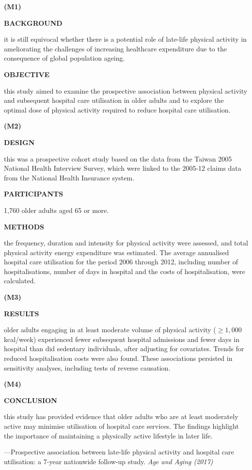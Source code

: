 \documentclass{ctexbook}
\begin{document}
\begin{sample}[label={myautocounter}]{\heiti}

\textbf{(M1)}

\textbf{BACKGROUND }

it is still equivocal whether there is a potential role of late-life physical activity in ameliorating the challenges of increasing healthcare expenditure due to the consequence of global population ageing.

\textbf{OBJECTIVE} 

this study aimed to examine the prospective association between physical activity and subsequent hospital care utilisation in older adults and to explore the optimal dose of physical activity required to reduce hospital care utilisation.

\textbf{(M2)}

\textbf{DESIGN} 

this was a prospective cohort study based on the data from the Taiwan 2005 National Health Interview Survey, which were linked to the 2005-12 claims data from the National Health Insurance system.

\textbf{PARTICIPANTS}

1,760 older adults aged 65 or more.

\textbf{METHODS} 

the frequency, duration and intensity for physical activity were assessed, and total physical activity energy expenditure was estimated. The average annualised hospital care utilisation for the period 2006 through 2012, including number of hospitalisations, number of days in hospital and the costs of hospitalisation, were calculated.

\textbf{(M3)}

\textbf{RESULTS }

older adults engaging in at least moderate volume of physical activity ($\geqslant 1,000$ kcal/week) experienced fewer subsequent hospital admissions and fewer days in hospital than did sedentary individuals, after adjusting for covariates. Trends for reduced hospitalisation costs were also found. These associations persisted in sensitivity analyses, including tests of reverse causation.

\textbf{(M4)}

\textbf{CONCLUSION}

this study has provided evidence that older adults who are at least moderately active may minimise utilisation of hospital care services. The findings highlight the importance of maintaining a physically active lifestyle in later life.

\begin{flushright}
  ---Prospective association between late-life physical activity and hospital care utilisation: a 7-year nationwide follow-up study. \emph{Age and Aging (2017)}
\end{flushright}

\end{sample}
\end{document}
